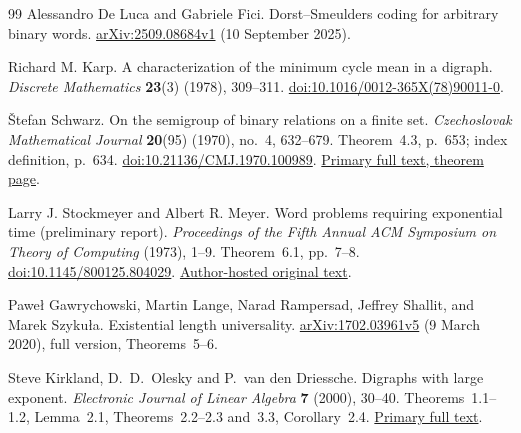 \documentclass[11pt,letterpaper]{article}
\theoremstyle{definition}
\theoremstyle{remark}
\begin{document}
\begin{thebibliography}{99}
Alessandro De Luca and Gabriele Fici.
Dorst--Smeulders coding for arbitrary binary words.
\href{https://arxiv.org/abs/2509.08684v1}{arXiv:2509.08684v1} (10 September 2025).

Richard M. Karp.
A characterization of the minimum cycle mean in a digraph.
\emph{Discrete Mathematics} \textbf{23}(3) (1978), 309--311.
\href{https://doi.org/10.1016/0012-365X(78)90011-0}{doi:10.1016/0012-365X(78)90011-0}.

\v{S}tefan Schwarz.
On the semigroup of binary relations on a finite set.
\emph{Czechoslovak Mathematical Journal} \textbf{20}(95) (1970), no.~4, 632--679.
Theorem~4.3, p.~653; index definition, p.~634.
\href{https://doi.org/10.21136/CMJ.1970.100989}{doi:10.21136/CMJ.1970.100989}.
\href{https://dml.cz/bitstream/handle/10338.dmlcz/100989/CzechMathJ_20-1970-4_9.pdf\#page=23}{Primary full text, theorem page}.

Larry J. Stockmeyer and Albert R. Meyer.
Word problems requiring exponential time (preliminary report).
\emph{Proceedings of the Fifth Annual ACM Symposium on Theory of Computing} (1973), 1--9.
Theorem~6.1, pp.~7--8.
\href{https://doi.org/10.1145/800125.804029}{doi:10.1145/800125.804029}.
\href{https://people.csail.mit.edu/meyer/meyer-stockmeyer-word-probs.pdf}{Author-hosted original text}.

Pawe\l{} Gawrychowski, Martin Lange, Narad Rampersad, Jeffrey Shallit, and Marek Szyku\l{}a.
Existential length universality.
\href{https://arxiv.org/abs/1702.03961v5}{arXiv:1702.03961v5} (9 March 2020), full version, Theorems~5--6.

Steve Kirkland, D.~D.~Olesky and P.~van den Driessche.
Digraphs with large exponent.
\emph{Electronic Journal of Linear Algebra} \textbf{7} (2000), 30--40.
Theorems~1.1--1.2, Lemma~2.1, Theorems~2.2--2.3 and~3.3, Corollary~2.4.
\href{https://www2.math.ethz.ch/EMIS/journals/ELA/ela-articles/articles/vol7_pp30-40.pdf}{Primary full text}.
\end{thebibliography}
\end{document}
